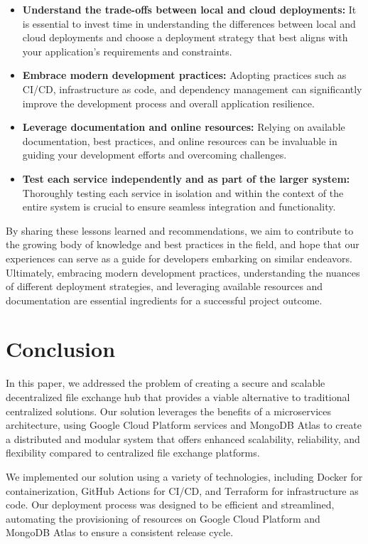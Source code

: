 \documentclass[a4paper,fleqn]{cas-sc}
\begin{document}
\begin{itemize}
	\item \textbf{Understand the trade-offs between local and cloud deployments:} It is essential to invest time in understanding the differences between local and cloud deployments and choose a deployment strategy that best aligns with your application's requirements and constraints.
	\item \textbf{Embrace modern development practices:} Adopting practices such as CI/CD, infrastructure as code, and dependency management can significantly improve the development process and overall application resilience.
	\item \textbf{Leverage documentation and online resources:} Relying on available documentation, best practices, and online resources can be invaluable in guiding your development efforts and overcoming challenges.
	\item \textbf{Test each service independently and as part of the larger system:} Thoroughly testing each service in isolation and within the context of the entire system is crucial to ensure seamless integration and functionality.
\end{itemize}

By sharing these lessons learned and recommendations, we aim to contribute to the growing body of knowledge and best practices in the field, and hope that our experiences can serve as a guide for developers embarking on similar endeavors. Ultimately, embracing modern development practices, understanding the nuances of different deployment strategies, and leveraging available resources and documentation are essential ingredients for a successful project outcome.

\section{Conclusion}

In this paper, we addressed the problem of creating a secure and scalable decentralized file exchange hub that provides a viable alternative to traditional centralized solutions. Our solution leverages the benefits of a microservices architecture, using Google Cloud Platform services and MongoDB Atlas to create a distributed and modular system that offers enhanced scalability, reliability, and flexibility compared to centralized file exchange platforms.

We implemented our solution using a variety of technologies, including Docker for containerization, GitHub Actions for CI/CD, and Terraform for infrastructure as code. Our deployment process was designed to be efficient and streamlined, automating the provisioning of resources on Google Cloud Platform and MongoDB Atlas to ensure a consistent release cycle.
\end{document}
